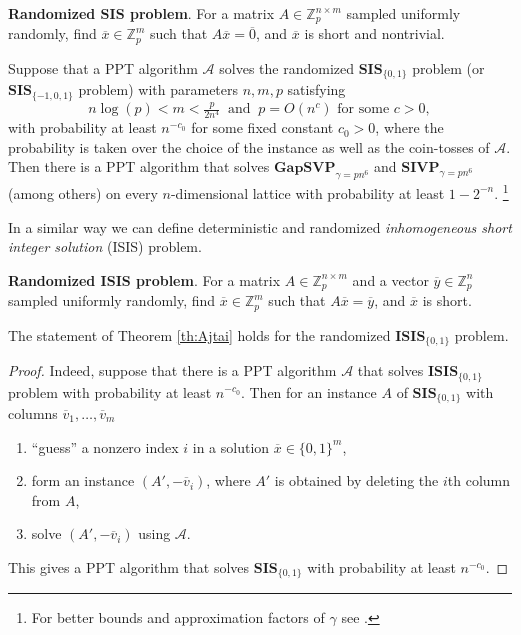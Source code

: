 \documentclass{jgcc}
\def\ovo{{\overline{0}}}
\def\ovv{{\overline{v}}}
\def\ovx{{\overline{x}}}
\def\ovy{{\overline{y}}}
\def\CA{{\mathcal A}}
\def\SIS{{\mathbf{SIS}}}
\def\ISIS{{\mathbf{ISIS}}}
\def\SIVP{{\mathbf{SIVP}}}
\def\GAPSVP{{\mathbf{GapSVP}}}
\def\MZ{{\mathbb{Z}}}
\begin{document}
\medskip\noindent
\textbf{Randomized $\SIS$ problem}.
For a matrix  $A\in \MZ_p^{n\times m}$
sampled uniformly randomly,
find $\ovx\in\MZ_p^m$ such that
$A\ovx=\ovo$, and
$\ovx$ is short and nontrivial.

\begin{thm}
\label{th:Ajtai}
Suppose that a PPT algorithm $\CA$ solves
the randomized $\SIS_{\{0,1\}}$ problem 
(or $\SIS_{\{-1,0,1\}}$ problem)
with parameters $n,m,p$ satisfying
\begin{equation}\label{eq:mnp-conditions}
n\log(p) < m < \tfrac{p}{2n^4}
\ \mbox{ and }\ 
p=O(n^c) \mbox{ for some }c>0,
\end{equation}
with probability at least $n^{-c_0}$ for some fixed constant $c_0>0$,
where the probability is taken over the choice of 
the instance as well as the coin-tosses of $\CA$.
Then there is a PPT algorithm
that solves 
$\GAPSVP_{\gamma=pn^6}$ and $\SIVP_{\gamma=pn^6}$ (among others)
on every $n$-dimensional lattice with probability at least $1-2^{-n}$.
\footnote{For better bounds and approximation factors of $\gamma$ see 
\cite{Micciancio-Regev:2007}.}
\end{thm}


In a similar way we can define deterministic and randomized 
\emph{inhomogeneous short integer solution} (ISIS) problem. 

\medskip\noindent
\textbf{Randomized $\ISIS$ problem}.
For a matrix  $A\in \MZ_p^{n\times m}$ and a vector $\ovy\in\MZ_p^n$
sampled uniformly randomly,
find $\ovx\in\MZ_p^m$ such that
$A\ovx=\ovy$, and
$\ovx$ is short.

\begin{cor}
The statement of Theorem \ref{th:Ajtai} holds for 
the randomized $\ISIS_{\{0,1\}}$ problem.
\end{cor}

\begin{proof}
Indeed, suppose that there is a PPT algorithm $\CA$ that solves
$\ISIS_{\{0,1\}}$ problem with probability at least $n^{-c_0}$.
Then for an instance $A$ of $\SIS_{\{0,1\}}$ 
with columns $\ovv_1,\dots,\ovv_m$ 
\begin{enumerate}
\item 
``guess'' a nonzero index $i$ in a solution $\ovx\in\{0,1\}^m$,
\item 
form an instance $(A',-\ovv_i)$, where
$A'$ is obtained by deleting the $i$th column from $A$,
\item 
solve $(A',-\ovv_i)$ using $\CA$.
\end{enumerate}
This gives a PPT algorithm that solves $\SIS_{\{0,1\}}$
with probability at least $n^{-c_0}$.
\end{proof}
\end{document}
